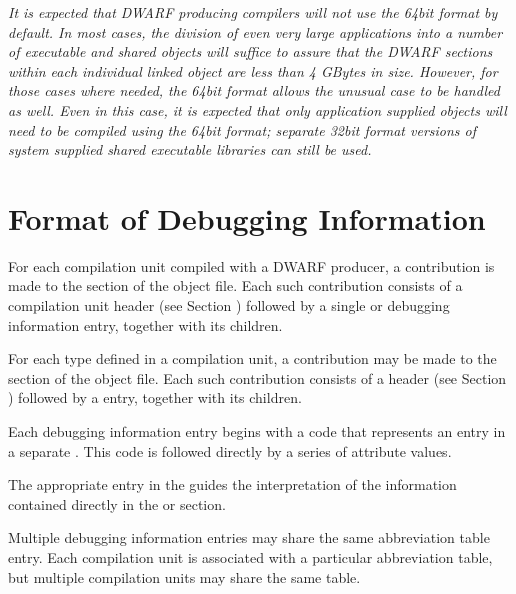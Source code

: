 \textit{It is expected that DWARF producing compilers will not use
the 64\dash bit format by default. In most cases, the division of
even very large applications into a number of executable and
shared objects will suffice to assure that the DWARF sections
within each individual linked object are less than 4 GBytes
in size. However, for those cases where needed, the 64\dash bit
format allows the unusual case to be handled as well. Even
in this case, it is expected that only application supplied
objects will need to be compiled using the 64\dash bit format;
separate 32\dash bit format versions of system supplied shared
executable libraries can still be used.}



\section{Format of Debugging Information}
\label{datarep:formatofdebugginginformation}

For each compilation unit compiled with a DWARF producer,
a contribution is made to the  section of
the object file. Each such contribution consists of a
compilation unit header 
(see Section ) 
followed by a
single  or 
 debugging
information entry, together with its children.

For each type defined in a compilation unit, a contribution may
be made to the  
section of the object file. Each
such contribution consists of a 
 header 
(see Section ) 
followed by a  entry, together with
its children.

Each debugging information entry begins with a code that
represents an entry in a separate 
. This
code is followed directly by a series of attribute values.

The appropriate entry in the 
 guides the
interpretation of the information contained directly in the
 or 
 section.

Multiple debugging information entries may share the same
abbreviation table entry. Each compilation unit is associated
with a particular abbreviation table, but multiple compilation
units may share the same table.
